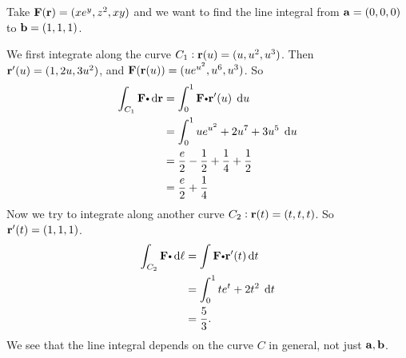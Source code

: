   
  
  \begin{exa}
  Take $\mathbf{ F}(\mathbf{ r}) = (xe^y, z^2, xy)$ and we want to find the line integral from $\mathbf{ a}=(0, 0, 0)$ to $\mathbf{ b}=(1, 1, 1)$.
  \begin{center}
  \end{center}
  We first integrate along the curve $C_1: \mathbf{ r}(u) = (u, u^2, u^3)$. Then $\mathbf{ r}'(u) = (1, 2u, 3u^2)$, and $\mathbf{ F}(\mathbf{ r}(u)) = (ue^{u^2}, u^6, u^3)$. So
  \begin{align*}
    \dint_{C_1} \vector{F}\bp \d\vector{r} &= \dint_0^1 \vector{F}\bp\vector{r}'(u)\; \d u\\
    &= \dint_0^1 ue^{u^2} + 2u^7 + 3u^5\;\d u\\
    &= \dfrac{e}{2} -\dfrac{1}{2} + \dfrac{1}{4} + \dfrac{1}{2}\\
    &= \dfrac{e}{2} + \dfrac{1}{4}
  \end{align*}
  Now we try to integrate along another curve $C_2: \mathbf{ r}(t) = (t, t, t)$. So $\mathbf{ r}'(t) = (1,1, 1)$.
  \begin{align*}
    \dint_{C_2} \vector{F}\bp \d \ell &= \dint \vector{F}\bp \vector{r}'(t)\d t\\
    &= \dint_0^1 te^t + 2t^2\; \d t\\
    &= \dfrac{5}{3}.
  \end{align*}
  We see that the line integral depends on the curve $C$ in general, not just $\mathbf{ a}, \mathbf{ b}$.
\end{exa}

  
  


